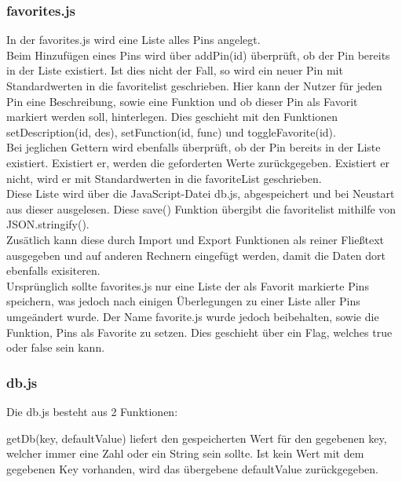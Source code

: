 \subsubsection{favorites.js}

In der \textrm{favorites.js} wird eine Liste alles Pins angelegt. \\
Beim Hinzufügen eines Pins wird über \textrm{addPin(id)} überprüft, ob der Pin bereits in der Liste existiert. Ist dies nicht der 
Fall, so wird ein neuer Pin mit Standardwerten in die \textrm{favoritelist} geschrieben. 
Hier kann der Nutzer für jeden Pin eine
Beschreibung, sowie eine Funktion und ob dieser Pin als Favorit markiert werden soll, 
hinterlegen. Dies geschieht mit den Funktionen \textrm{setDescription(id, des)}, 
\textrm{setFunction(id, func)} und \textrm{toggleFavorite(id)}.\\
Bei jeglichen Gettern wird ebenfalls überprüft, ob der Pin bereits in der Liste existiert. Existiert er, werden die 
geforderten Werte zurückgegeben. Existiert er nicht, wird er mit Standardwerten in die \textrm{favoriteList} geschrieben.\\
 Diese Liste wird über die JavaScript-Datei 
\textrm{db.js}, abgespeichert und bei Neustart aus dieser ausgelesen. Diese \textrm{save()} Funktion übergibt die 
\textrm{favoritelist} mithilfe von \textrm{JSON.stringify()}.\\
Zusätlich kann diese durch Import und Export Funktionen als reiner Fließtext ausgegeben und auf anderen Rechnern 
eingefügt werden, damit die Daten dort ebenfalls exisiteren.\\
Ursprünglich sollte \textrm{favorites.js} nur eine Liste der als Favorit markierte Pins speichern, 
was jedoch nach einigen Überlegungen zu einer Liste aller Pins umgeändert wurde. Der Name 
\textrm{favorite.js} wurde jedoch beibehalten, sowie die Funktion, Pins als Favorite zu setzen. 
Dies geschieht über ein Flag, welches \textrm{true} oder \textrm{false} sein kann.\\

\subsubsection{db.js}
Die \textrm{db.js} besteht aus 2 Funktionen: 

\textrm{getDb(key, defaultValue)} liefert den gespeicherten Wert für den
gegebenen \textrm{key}, welcher immer eine Zahl oder ein String sein sollte. Ist
kein Wert mit dem gegebenen Key vorhanden, wird das
übergebene \textrm{defaultValue} zurückgegeben.


